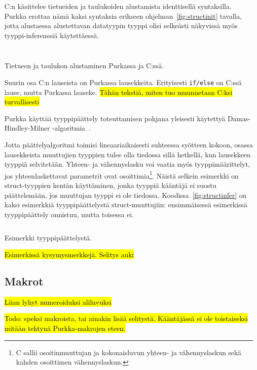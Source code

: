 C:n käsittelee tietueiden ja taulukoiden alustamista identtisellä syntaksilla.
Purkka erottaa nämä kaksi syntaksia erikseen ohjelman~\ref{fig:structinit}
tavalla, jotta alustaessa alustettavan datatyypin tyyppi olisi selkeästi
näkyvissä myös tyyppi-inferenssiä käytettäessä.

\begin{listing}[ht!]
    \inputminted{Rust}{koodi/structinit.prk}
    \inputminted{C}{koodi/structinit.c}
    \caption{Tietueen ja taulukon alustaminen Purkassa ja C:ssä.}
    \label{fig:structinit}
\end{listing}

Suurin osa C:n lauseista on Purkassa lausekkeita. Erityisesti \texttt{if/else}
on C:ssä lause, mutta Purkassa lauseke. \hl{Tähän tekstiä, miten tuo muunnetaan
C:ksi turvallisesti}

Purkka käyttää tyyppipäättely toteuttamisen pohjana yleisesti käytettyä
Damas-Hindley-Milner -algoritmia~\citep{hindley, milner, damas}.

Jotta päättelyalgoritmi toimisi lineaariaikaisesti suhteessa syötteen kokoon,
osassa lausekkeista muuttujien tyyppien tulee olla tiedossa sillä hetkellä, kun
lausekkeen tyyppiä selvitetään. Yhteen- ja vähennyslasku voi vaatia myös
tyyppimäärittelyt, jos yhteenlaskettavat parametrit ovat osoittimia\footnote{C
sallii osoitinmuuttujan ja kokonaisluvun yhteen- ja vähennyslaskun sekä kahden
osoittimen vähennyslaskun.}. Näistä selkein esimerkki on struct-tyyppien kentän
käyttäminen, jonka tyyppiä kääntäjä ei suostu päättelemään, jos muuttujan
tyyppi ei ole tiedossa. Koodissa~\ref{fig:structinfer} on kaksi esimerkkiä
tyyppipäättelystä struct-muuttujiin: ensimmäisessä esimerkissä
tyyppipäättely onnistuu, mutta toisessa ei.

\begin{listing}[ht!]
    \inputminted{Rust}{koodi/infer.prk}
    \caption{Esimerkki tyyppipäättelystä.}
    \label{fig:structinfer}
\end{listing}

\FloatBarrier

\hl {Esimerkissä kysymysmerkkejä. Selitys auki}

\subsection{Makrot}

\hl{Liian lyhyt numeroiduksi aliluvuksi}

\hl{Todo: speksi makroista, tai ainakin lisää selitystä. Kääntäjässä ei ole
toistaiseksi mitään tehtynä Purkka-makrojen eteen.}

